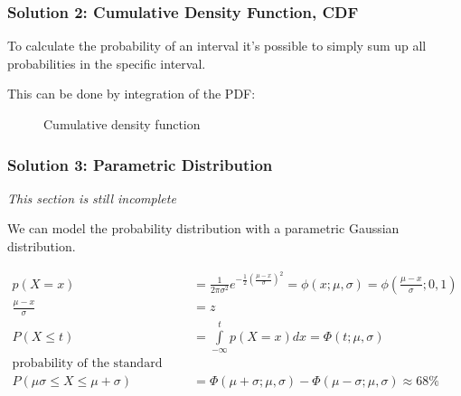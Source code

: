 \subsubsection[Cumulative Density Function (CDF)]{Solution 2: Cumulative Density Function, CDF}
To calculate the probability of an interval it's possible to simply sum up all probabilities in the specific interval.

This can be done by integration of the PDF: 

\begin{figure}[h]
\centering
{}
\caption{Cumulative density function}
\end{figure}


\subsubsection{Solution 3: Parametric Distribution}
\textit{This section is still incomplete}

We can model the probability distribution with a parametric Gaussian distribution.

\begin{align*}
p(X=x) &= \frac{1}{2\pi\sigma^2}e^{-\frac{1}{2}\left(\frac{\mu-x}{\sigma}\right)^2} = \phi(x;\mu,\sigma) = \phi\left(\frac{\mu-x}{\sigma};0,1\right) \\
\frac{\mu-x}{\sigma}&=z \\
P(X \leq t) &= \int\limits_{-\infty}^{t}{p(X=x)} dx = \Phi(t;\mu,\sigma) \\
\mbox{probability of the standard deviation: } \\
P(\mu\sigma \leq X \leq \mu + \sigma) &= \Phi(\mu+\sigma;\mu,\sigma) - \Phi(\mu-\sigma;\mu,\sigma) \approx 68\%
\end{align*}

